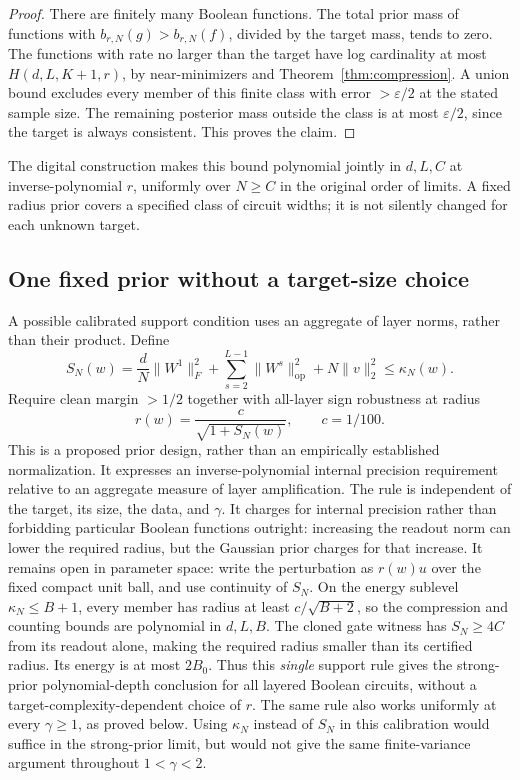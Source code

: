\documentclass[11pt]{article}
\newcommand{\op}{\mathrm{op}}
\begin{document}
\begin{proof}
There are finitely many Boolean functions. The total prior mass of functions
with $b_{r,N}(g)>b_{r,N}(f)$, divided by the target mass, tends to zero.
The functions with rate no larger than the target have log cardinality at
most $H(d,L,K+1,r)$, by near-minimizers and Theorem~\ref{thm:compression}.
A union bound excludes every member of this finite class with error
$>\varepsilon/2$ at the stated sample size. The remaining posterior mass
outside the class is at most $\varepsilon/2$, since the target is always
consistent. This proves the claim.
\end{proof}

The digital construction makes this bound polynomial jointly in $d,L,C$
at inverse-polynomial $r$, uniformly over $N\ge C$ in the original order of
limits. A fixed radius prior covers a specified class of circuit widths;
it is not silently changed for each unknown target.

\subsection{One fixed prior without a target-size choice}\label{sec:selfcal}

A possible calibrated support condition uses an aggregate of layer norms,
rather than their product. Define
\[
 S_N(w)=\frac dN\|W^1\|_F^2+
 \sum_{s=2}^{L-1}\|W^s\|_\op^2+N\|v\|_2^2\le\kappa_N(w).
\]
Require clean margin $>1/2$ together with all-layer sign robustness at radius
\[
 r(w)=\frac{c}{\sqrt{1+S_N(w)}},\qquad c=1/100.
\]
This is a proposed prior design, rather than an empirically established
normalization. It expresses an inverse-polynomial internal precision
requirement relative to an aggregate measure of layer amplification.
The rule is independent of the target, its size, the data, and $\gamma$.
It charges for internal precision rather than forbidding particular Boolean
functions outright: increasing the readout norm can lower the required
radius, but the Gaussian prior charges for that increase.
It remains open in parameter space: write the perturbation as $r(w)u$
over the fixed compact unit ball, and use continuity of $S_N$.
On the energy sublevel $\kappa_N\le B+1$, every member has radius at least
$c/\sqrt{B+2}$, so the compression and counting bounds are polynomial
in $d,L,B$. The cloned gate witness has $S_N\ge4C$ from its
readout alone, making the required radius smaller than its certified radius.
Its energy is at most $2B_0$. Thus this \emph{single} support rule gives the
strong-prior polynomial-depth conclusion for all layered Boolean circuits,
without a target-complexity-dependent choice of $r$. The same rule also works
uniformly at every $\gamma\ge1$, as proved below. Using $\kappa_N$ instead of
$S_N$ in this calibration would suffice in the strong-prior limit, but would
not give the same finite-variance argument throughout $1<\gamma<2$.
\end{document}
